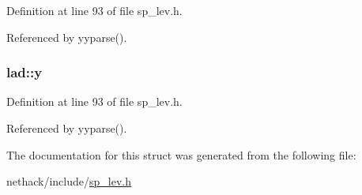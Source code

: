 Definition at line 93 of file sp\+\_\+lev.\+h.



Referenced by yyparse().

\hypertarget{structlad_a5b9678013ed20dc567ad41299bbe1ebd}{
\subsubsection[{y}]{ lad\+::y}}\label{structlad_a5b9678013ed20dc567ad41299bbe1ebd}


Definition at line 93 of file sp\+\_\+lev.\+h.



Referenced by yyparse().



The documentation for this struct was generated from the following file\+:\begin{DoxyCompactItemize}
\item 
nethack/include/\hyperlink{sp__lev_8h}{sp\+\_\+lev.\+h}\end{DoxyCompactItemize}

